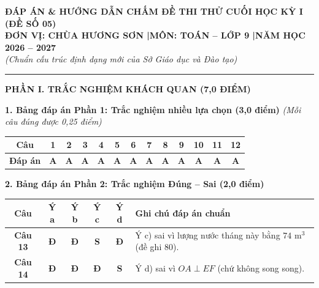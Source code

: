 \documentclass[11pt,a4paper]{article}
\begin{document}
\begin{center}
{\large\bfseries ĐÁP ÁN \& HƯỚNG DẪN CHẤM ĐỀ THI THỬ CUỐI HỌC KỲ I (ĐỀ SỐ 05)}\\[1.5mm]
{\bfseries ĐƠN VỊ: CHÙA HƯƠNG SƠN \quad|\quad MÔN: TOÁN -- LỚP 9 \quad|\quad NĂM HỌC 2026 -- 2027}\\[1mm]
\textit{(Chuẩn cấu trúc định dạng mới của Sở Giáo dục và Đào tạo)}
\end{center}

\vspace{1mm}
\hrule
\vspace{3mm}

\noindent
\textbf{\large PHẦN I. TRẮC NGHIỆM KHÁCH QUAN (7,0 ĐIỂM)}

\vspace{2mm}
\noindent
\textbf{1. Bảng đáp án Phần 1: Trắc nghiệm nhiều lựa chọn (3,0 điểm)} \textit{(Mỗi câu đúng được 0,25 điểm)}
\begin{center}
\begin{tabular}{|c|c|c|c|c|c|c|c|c|c|c|c|c|}
\hline
\textbf{Câu} & \textbf{1} & \textbf{2} & \textbf{3} & \textbf{4} & \textbf{5} & \textbf{6} & \textbf{7} & \textbf{8} & \textbf{9} & \textbf{10} & \textbf{11} & \textbf{12} \\
\hline
\textbf{Đáp án} & \textbf{A} & \textbf{A} & \textbf{A} & \textbf{A} & \textbf{A} & \textbf{A} & \textbf{A} & \textbf{A} & \textbf{A} & \textbf{A} & \textbf{A} & \textbf{A} \\
\hline
\end{tabular}
\end{center}

\vspace{2mm}
\noindent
\textbf{2. Bảng đáp án Phần 2: Trắc nghiệm Đúng -- Sai (2,0 điểm)}
\begin{center}
\begin{tabular}{|c|c|c|c|c|l|}
\hline
\textbf{Câu} & \textbf{Ý a} & \textbf{Ý b} & \textbf{Ý c} & \textbf{Ý d} & \textbf{Ghi chú đáp án chuẩn} \\
\hline
\textbf{Câu 13} & \textbf{Đ} & \textbf{Đ} & \textbf{S} & \textbf{Đ} & Ý c) sai vì lượng nước tháng này bằng $74\text{ m}^3$ (đề ghi $80$). \\
\hline
\textbf{Câu 14} & \textbf{Đ} & \textbf{Đ} & \textbf{Đ} & \textbf{S} & Ý d) sai vì $OA \perp EF$ (chứ không song song). \\
\hline
\end{tabular}
\end{center}
\end{document}
